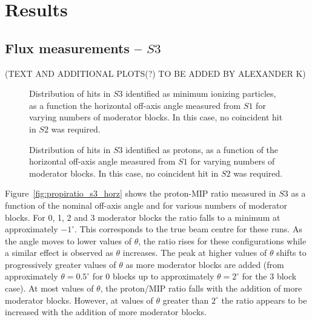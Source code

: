 \section{Results}
\label{hptpcPaper:sec:Results}

	\subsection{Flux measurements -- $S3$}
(TEXT AND ADDITIONAL PLOTS(?) TO BE ADDED BY ALEXANDER K)
	
	\begin{figure}[h]
		\begin{minipage}{0.48\textwidth}
			\begin{adjustbox}{max totalsize={\textwidth}{.35\textheight},center}
				
			\end{adjustbox}
			\caption{Distribution of hits in $S3$ identified as minimum ionizing particles, as a function the horizontal off-axis angle measured from $S1$ for varying numbers of moderator blocks. In this case, no coincident hit in $S2$ was required.}
			\label{fig:s1s3mips}
		\end{minipage}
		\hspace{0.3cm}
		\begin{minipage}{0.48\textwidth}
			\begin{adjustbox}{max totalsize={\textwidth}{.35\textheight},center}
				
			\end{adjustbox}
			\caption{Distribution of hits in $S3$ identified as protons, as a function of the horizontal off-axis angle measured from $S1$ for varying numbers of moderator blocks. In this case, no coincident hit in $S2$ was required.}
			\label{fig:s1s3protons}
		\end{minipage}
	\end{figure}

	Figure~\ref{fig:propiratio_s3_horz} shows the proton-MIP ratio measured in $S3$ as a function of the nominal off-axis angle and for various numbers of moderator blocks.
	For 0, 1, 2 and 3 moderator blocks the ratio falls to a minimum at approximately $-1^{\circ}$. This corresponds to the true beam centre for these runs.
	As the angle moves to lower values of $\theta$, the ratio rises for these configurations while a similar effect is observed as $\theta$ increases.
	The peak at higher values of $\theta$ shifts to progressively greater values of $\theta$ as more moderator blocks are added (from approximately $\theta = 0.5^{\circ}$ for 0 blocks up to approximately $\theta = 2^{\circ}$ for the 3 block case).
	At most values of $\theta$, the proton/MIP ratio falls with the addition of more moderator blocks. 
	However, at values of $\theta$ greater than $2^{\circ}$ the ratio appears to be increased with the addition of more moderator blocks.


